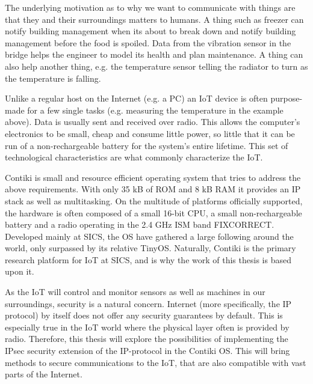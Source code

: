 \documentclass[final,a4paper,twoside,11pt,onecolumn]{report}
\begin{document}
The underlying motivation as to why we want to communicate with things are that they and their surroundings matters to humans. A thing such as freezer can notify building management when its about to break down and notify building management before the food is spoiled. Data from the vibration sensor in the bridge helps the engineer to model its health and plan maintenance. A thing can also help another thing, e.g. the temperature sensor telling the radiator to turn as the temperature is falling.


Unlike a regular host on the Internet (e.g. a PC) an IoT device is often purpose-made for a few single tasks (e.g. measuring the temperature in the example above). Data is usually sent and received over radio. This allows the computer's electronics to be small, cheap and consume little power, so little that it can be run of a non-rechargeable battery for the system's entire lifetime. This set of technological characteristics are what commonly characterize the IoT.


Contiki is small and resource efficient operating system that tries to address the above requirements. With only 35 kB of ROM and 8 kB RAM it provides an IP stack as well as multitasking. On the multitude of platforms officially supported, the hardware is often composed of a small 16-bit CPU, a small non-rechargeable battery and a radio operating in the 2.4 GHz ISM band FIXCORRECT. Developed mainly at SICS, the OS have gathered a large following around the world, only surpassed by its relative TinyOS. Naturally, Contiki is the primary research platform for IoT at SICS, and is why the work of this thesis is based upon it.

As the IoT will control and monitor sensors as well as machines in our surroundings, security is a natural concern. Internet (more specifically, the IP protocol) by itself does not offer any security guarantees by default. This is especially true in the IoT world where the physical layer often is provided by radio. Therefore, this thesis will explore the possibilities of implementing the IPsec security extension of the IP-protocol in the Contiki OS. This will bring methods to secure communications to the IoT, that are also compatible with vast parts of the Internet.
\end{document}
